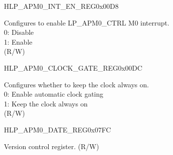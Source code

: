 \begin{register}{H}{LP\_APM0\_INT\_EN\_REG}{0x00D8}\label{regdesc:LPAPM0INTENREG}
%
%
\regnewline%
\begin{regdesc}\begin{reglist}
\label{fielddesc:LPAPM0M0APMINTEN}\item [LP\_APM0\_M0\_APM\_INT\_EN] Configures to enable LP\_APM0\_CTRL M0 interrupt.\\
0: Disable \\
1: Enable  \\ (R/W)
\end{reglist}\end{regdesc}
\end{register}


\begin{register}{H}{LP\_APM0\_CLOCK\_GATE\_REG}{0x00DC}\label{regdesc:LPAPM0CLOCKGATEREG}
%
%
\regnewline%
\begin{regdesc}\begin{reglist}
\label{fielddesc:LPAPM0CLKEN}\item [LP\_APM0\_CLK\_EN] Configures whether to keep the clock always on.\\
0: Enable automatic clock gating \\
1: Keep the clock always on  \\ (R/W)
\end{reglist}\end{regdesc}
\end{register}


\begin{register}{H}{LP\_APM0\_DATE\_REG}{0x07FC}\label{regdesc:LPAPM0DATEREG}
%
%
\regnewline%
\begin{regdesc}\begin{reglist}
\label{fielddesc:LPAPM0DATE}\item [LP\_APM0\_DATE] Version control register. (R/W)
\end{reglist}\end{regdesc}
\end{register}


